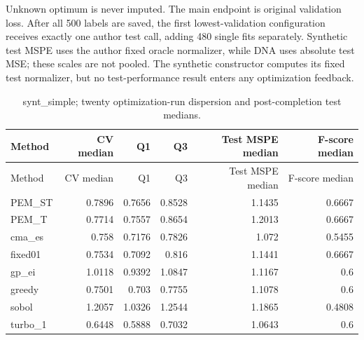 \documentclass[11pt,a4paper]{article}
\begin{document}
Unknown optimum is never imputed. The main endpoint is original
validation loss. After all 500 labels are saved, the first
lowest-validation configuration receives exactly one author test call,
adding 480 single fits separately. Synthetic test MSPE uses the author
fixed oracle normalizer, while DNA uses absolute test MSE; these scales
are not pooled. The synthetic constructor computes its fixed test
normalizer, but no test-performance result enters any optimization
feedback.

\par\noindent\begin{minipage}{\linewidth}

\begin{longtable}[]{@{}lrrrrr@{}}
\caption{synt\_simple; twenty optimization-run dispersion and
post-completion test medians.}\tabularnewline
\toprule
Method & CV median & Q1 & Q3 & Test MSPE median & F-score median \\
\midrule
\endfirsthead
\toprule
Method & CV median & Q1 & Q3 & Test MSPE median & F-score median \\
\midrule
\endhead
PEM\_ST & 0.7896 & 0.7656 & 0.8528 & 1.1435 & 0.6667 \\
PEM\_T & 0.7714 & 0.7557 & 0.8654 & 1.2013 & 0.6667 \\
cma\_es & 0.758 & 0.7176 & 0.7826 & 1.072 & 0.5455 \\
fixed01 & 0.7534 & 0.7092 & 0.816 & 1.1441 & 0.6667 \\
gp\_ei & 1.0118 & 0.9392 & 1.0847 & 1.1167 & 0.6 \\
greedy & 0.7501 & 0.703 & 0.7755 & 1.1078 & 0.6 \\
sobol & 1.2057 & 1.0326 & 1.2544 & 1.1865 & 0.4808 \\
turbo\_1 & 0.6448 & 0.5888 & 0.7032 & 1.0643 & 0.6 \\
\bottomrule
\end{longtable}

\end{minipage}\par
\end{document}
